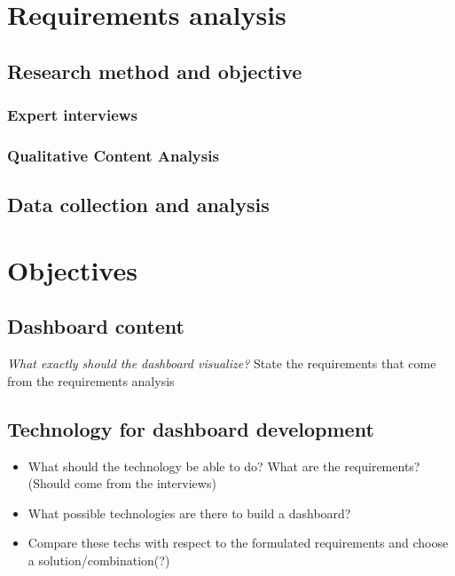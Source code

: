 \section{Requirements analysis}


\subsection{Research method and objective}

\subsubsection{Expert interviews}

\subsubsection{Qualitative Content Analysis}

\subsection{Data collection and analysis}

\section{Objectives}

\subsection{Dashboard content}
\textit{What exactly should the dashboard visualize?}
State the requirements that come from the requirements analysis

\subsection{Technology for dashboard development}
\begin{itemize}
    \item What should the technology be able to do? What are the requirements? (Should come from the interviews)
    \item What possible technologies are there to build a dashboard? 
    \item Compare these techs with respect to the formulated requirements and choose a solution/combination(?)
\end{itemize}

